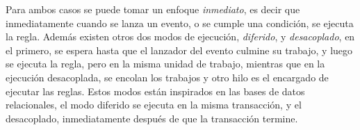 Para ambos casos se puede tomar un enfoque \emph{inmediato}, es decir que
inmediatamente cuando se lanza un evento, o se cumple una condición, se ejecuta
la regla. Además existen otros dos modos de ejecución, \emph{diferido}, y
\emph{desacoplado}, en el primero, se espera hasta que el lanzador del evento
culmine su trabajo, y luego se ejecuta la regla, pero en la misma unidad de
trabajo, mientras que en la ejecución desacoplada, se encolan los trabajos y
otro hilo es el encargado de ejecutar las reglas. Estos modos están inspirados
en las bases de datos relacionales, el modo diferido se ejecuta en la misma
transacción, y el desacoplado, inmediatamente después de que la transacción
termine\cite{bailey2004event}.
